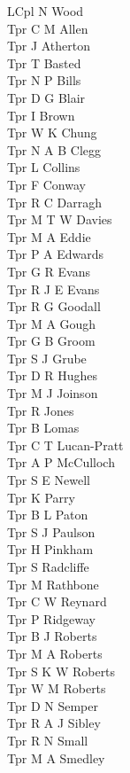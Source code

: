 \begin{multicols}{3}
  LCpl N Wood \\
  Tpr C M Allen \\
  Tpr J Atherton \\
  Tpr T Basted \\
  Tpr N P Bills \\
  Tpr D G Blair \\
  Tpr I Brown \\
  Tpr W K Chung \\
  Tpr N A B Clegg \\
  Tpr L Collins \\
  Tpr F Conway \\
  Tpr R C Darragh \\
  Tpr M T W Davies \\
  Tpr M A Eddie \\
  Tpr P A Edwards \\
  Tpr G R Evans \\
  Tpr R J E Evans \\
  Tpr R G Goodall \\
  Tpr M A Gough \\
  Tpr G B Groom \\
  Tpr S J Grube \\
  Tpr D R Hughes \\
  Tpr M J Joinson \\
  Tpr R Jones \\
  Tpr B Lomas \\
  Tpr C T Lucan-Pratt \\
  Tpr A P McCulloch \\
  Tpr S E Newell \\
  Tpr K Parry \\
  Tpr B L Paton \\
  Tpr S J Paulson \\
  Tpr H Pinkham \\
  Tpr S Radcliffe \\
  Tpr M Rathbone \\
  Tpr C W Reynard \\
  Tpr P Ridgeway \\
  Tpr B J Roberts \\
  Tpr M A Roberts \\
  Tpr S K W Roberts \\
  Tpr W M Roberts \\
  Tpr D N Semper \\
  Tpr R A J Sibley \\
  Tpr R N Small \\
  Tpr M A Smedley \\

\end{multicols}
